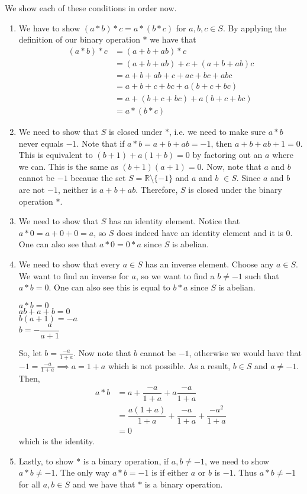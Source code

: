 \documentclass{article}
\begin{document}
\noindent
We show each of these conditions in order now.
\begin{enumerate}
	\item We have to show $(a * b) * c = a * (b * c)$ for $a, b, c \in S$. By applying the definition of our binary operation $*$ we have that
	\begin{align*}
		(a * b) * c &= (a + b + ab) * c	\\
		&= (a + b + ab) + c + (a + b + ab) c \\
		&= a + b + ab + c + ac + bc + abc \\
		&= a + b + c + bc + a(b + c + bc) \\
		&= a + (b + c + bc) + a(b + c + bc) \\		
		&= a * (b * c)
	\end{align*}
	
	\item We need to show that $S$ is closed under $*$, i.e. we need to make sure $a * b$ never equals $-1$.  Note that if $a * b = a + b + ab = -1$, then $a + b + ab + 1 = 0$.  This is equivalent to $(b + 1) + a(1 + b) = 0$ by factoring out an $a$ where we can. This is the same as $(b+1)(a+1) = 0$. Now, note that $a$ and $b$ cannot be $-1$ because the set $S = \mathbb{R} \setminus \{-1\}$ and $a$ and $b$ $\in S$. Since $a$ and $b$ are not $-1$, neither is $a + b + ab$. Therefore, $S$ is closed under the binary operation $*$.
	
	\item We need to show that $S$ has an identity element. Notice that $a * 0 = a + 0 + 0 = a$, so $S$ does indeed have an identity element and it is $0$. One can also see that $a * 0 = 0 * a$ since $S$ is abelian.
	
	\item We need to show that every $a \in S$ has an inverse element. Choose any $a \in S$. We want to find an inverse for $a$, so we want to find a $b \neq -1$ such that $a * b = 0$. One can also see this is equal to $b * a$ since $S$ is abelian.
	\begin{center}
		$ a * b = 0$ \\
		$ ab + a + b = 0$ \\
		$ b(a + 1) = -a$ \\
		$ b = -\dfrac{a}{a+1} $
	\end{center}	
\noindent
So, let $b = \frac{-a}{1+a}$. Now note that $b$ cannot be $-1$, otherwise we would have that $-1 = \frac{-a}{1+a} \implies a = 1 + a$ which is not possible. As a result, $b \in S$ and $a \neq -1$. Then, 
	\begin{align*}
		a * b &= a + \dfrac{-a}{1+a} + a\dfrac{-a}{1+a} \\
		&= \dfrac{a(1+a)}{1+a} + \dfrac{-a}{1+a} + \dfrac{-a^{2}}{1+a} \\
		&= 0
	\end{align*}
which is the identity.
\item Lastly, to show $*$ is a binary operation, if $a, b \neq -1$, we need to show $a * b \neq -1$. The only way $a * b = -1$ is if either $a$ or $b$ is $-1$. Thus $a * b \neq -1$ for all $a, b \in S$ and we have that $*$ is a binary operation.
\end{enumerate}
\end{document}
